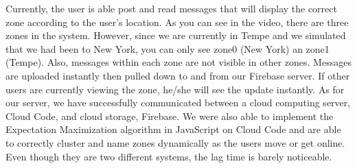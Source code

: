 Currently, the user is able post and read messages that will display the correct zone according to the user's location. As you can see in the video, there are three zones in the system. However, since we are currently in Tempe and we simulated that we had been to New York, you can only see zone0 (New York) an zone1 (Tempe). Also, messages within each zone are not visible in other zones. Messages are uploaded instantly then pulled down to and from our Firebase server. If other users are currently viewing the zone, he/she will see the update instantly. As for our server, we have successfully communicated between a cloud computing server, Cloud Code, and cloud storage, Firebase. We were also able to implement the Expectation Maximization algorithm in JavaScript on Cloud Code and are able to correctly cluster and name zones dynamically as the users move or get online. Even though they are two different systems, the lag time is barely noticeable. 
